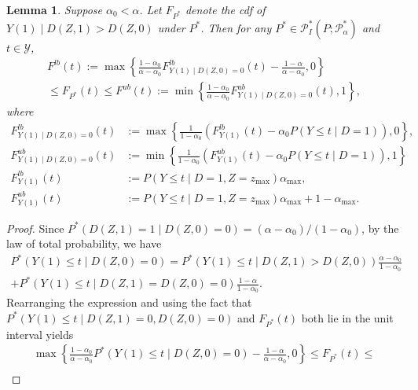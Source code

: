 \documentclass[12pt]{article}%
\newtheorem{lemma}{Lemma}
\theoremstyle{definition}
\newcommand\1{\operatorname{I}\indicatorfence}
\begin{document}
\begin{appendices}
\begin{lemma}\label{lemma:policy_complier_bounds}
  Suppose $\alpha_0<\alpha$. Let $F_{P^{*}}$ denote the cdf of
  $Y(1)\mid D(Z,1)>D(Z,0)$ under $P^{*}$. Then for any
  $P^* \in \mathcal{P}^*_{I}(P; \mathcal{P}_{\alpha}^*)$ and $t\in\mathcal{Y}$,
  \begin{multline*}
    F^{lb}(t):=
    \max\left\{\frac{1-\alpha_{0}}{\alpha-\alpha_{0}}
      F^{lb}_{Y(1)\mid D(Z,0)=0}(t)
      -\frac{1-\alpha}{\alpha-\alpha_{0}}, 0\right\}\\
    \leq F_{P^{*}}(t) \leq
    F^{ub}(t):=\min\left\{\frac{1-\alpha_{0}}{\alpha-\alpha_{0}}
      F^{ub}_{Y(1)\mid D(Z,0)=0}(t), 1\right\},
  \end{multline*}
  where
\begin{align}
  F^{lb}_{Y(1)\mid D(Z,0)=0}(t) &:= \max \left\{\frac{1}{1-\alpha_{0}} \left(F^{lb}_{Y(1)}(t) - \alpha_{0} P(Y \leq t \mid D=1) \right),0 \right\}, \\
  F^{ub}_{Y(1)\mid D(Z,0)=0}(t) &:= \min \left\{\frac{1}{1-\alpha_{0}}
                                  \left(F^{ub}_{Y(1)}(t) - \alpha_{0} P(Y \leq t
                                  \mid D=1) \right),1 \right\}\label{eq:y1_d0_ub}\\
  F^{lb}_{Y(1)}(t) &:= P(Y \leq t \mid D=1, Z=z_{\max})\alpha_{\max},
                     \label{eq:y1_lb}\\
  F^{ub}_{Y(1)}(t) &:= P(Y \leq t \mid D=1, Z=z_{\max}) \alpha_{\max}
                     + 1-\alpha_{\max}.\label{eq:y1_ub}
\end{align}
\end{lemma}
\begin{proof}
  Since $P^{*}(D(Z,1)=1\mid D(Z,0)=0)=(\alpha-\alpha_{0})/(1-\alpha_{0})$, by the law of total probability, we have
  \begin{multline}\label{eq:complier_bound}
    P^*(Y(1) \leq t \mid D(Z,0) =0)=
    P^*(Y(1) \leq t \mid D(Z,1)> D(Z,0))
    \frac{\alpha-\alpha_{0}}{1-\alpha_{0}} \\
    + P^*(Y(1) \leq t \mid D(Z,1)=D(Z,0) =0)\frac{1-\alpha}{1-\alpha_{0}}.
  \end{multline}
  Rearranging the expression and using the fact that
  $P^*(Y(1) \leq t \mid D(Z,1)=0, D(Z,0) =0)$ and $F_{P^{*}}(t)$ both lie in the
  unit interval yields
  \begin{multline*}
    \max\left\{\frac{1-\alpha_{0}}{\alpha-\alpha_{0}} P^*(Y(1) \leq t \mid D(Z,0) =0)
    -\frac{1-\alpha}{\alpha-\alpha_{0}}, 0\right\}\leq
    F_{P^{*}}(t) \leq\\

\end{multline*}
\end{proof}
\end{appendices}
\end{document}

